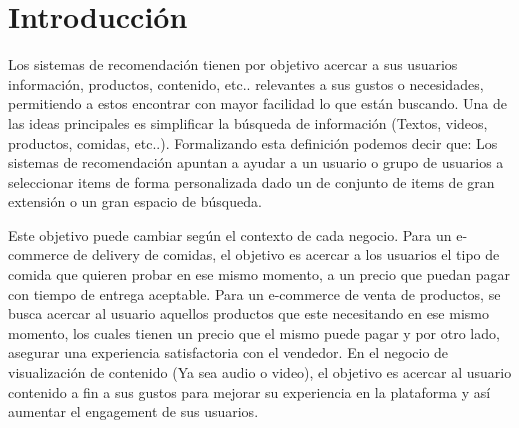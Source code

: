 \documentclass[11pt,a4paper]{tesis}
\begin{document}

\def\autor{Adrian Norberto Marino}
\def\tituloTesis{Sistemas de recomendación colaborativos e híbridos}
\def\runtitulo{Resumen}
\def\runtitle{Sistemas de recomendación colaborativos e híbridos}
\def\lugar{Buenos Aires, 2022}


\frontmatter
\pagestyle{empty}





\tableofcontents

\mainmatter
\pagestyle{headings}


\chapter{Introducción}

Los sistemas de recomendación tienen por objetivo acercar a sus usuarios información, productos, contenido, etc.. relevantes a sus gustos o necesidades, permitiendo a estos encontrar con mayor facilidad lo que están buscando. Una de las ideas principales es simplificar la búsqueda de información (Textos,   videos, productos, comidas, etc..).  Formalizando esta definición podemos decir que:  Los sistemas de recomendación apuntan a ayudar a un usuario o grupo de usuarios a seleccionar items de forma personalizada dado un de conjunto de items de gran extensión o un gran espacio de búsqueda.


Este objetivo puede cambiar según el contexto de cada negocio. Para un e-commerce de delivery de comidas, el objetivo es acercar a los usuarios el tipo de comida que quieren probar en ese mismo momento, a un precio que puedan pagar con tiempo de entrega aceptable. Para un e-commerce de venta de productos, se busca acercar al usuario aquellos productos que este necesitando en ese mismo momento, los cuales tienen un precio que el mismo puede pagar y por otro lado, asegurar una experiencia satisfactoria con el vendedor. En el negocio de visualización de contenido (Ya sea audio o video), el objetivo es acercar al usuario contenido a fin a sus gustos para mejorar su experiencia en la plataforma y así aumentar el engagement de sus usuarios.
\end{document}
